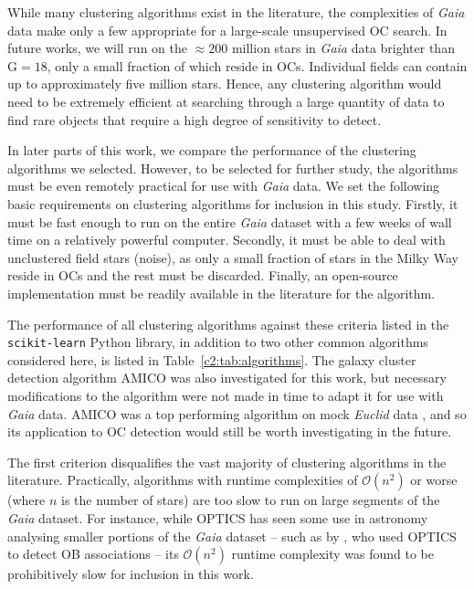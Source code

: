 While many clustering algorithms exist in the literature, the complexities of \emph{Gaia} data make only a few appropriate for a large-scale unsupervised OC search. In future works, we will run on the $\approx 200$ million stars in \emph{Gaia} data brighter than $\text{G}=18$, only a small fraction of which reside in OCs. Individual fields can contain up to approximately five million stars. Hence, any clustering algorithm would need to be extremely efficient at searching through a large quantity of data to find rare objects that require a high degree of sensitivity to detect.

In later parts of this work, we compare the performance of the clustering algorithms we selected. However, to be selected for further study, the algorithms must be even remotely practical for use with \emph{Gaia} data. We set the following basic requirements on clustering algorithms for inclusion in this study. Firstly, it must be fast enough to run on the entire \emph{Gaia} dataset with a few weeks of wall time on a relatively powerful computer. Secondly, it must be able to deal with unclustered field stars (noise), as only a small fraction of stars in the Milky Way reside in OCs and the rest must be discarded. Finally, an open-source implementation must be readily available in the literature for the algorithm.

The performance of all clustering algorithms against these criteria listed in the \texttt{scikit-learn} \citep{pedregosa_scikit-learn_2011} Python library, in addition to two other common algorithms considered here, is listed in Table~\ref{c2:tab:algorithms}. The galaxy cluster detection algorithm AMICO \citep[Adaptive Matched Identifier of Clustered Objects,][]{bellagamba_amico:_2018} was also investigated for this work, but necessary modifications to the algorithm were not made in time to adapt it for use with \emph{Gaia} data. AMICO was a top performing algorithm on mock \emph{Euclid} data \citep{euclid_collaboration_euclid_2019}, and so its application to OC detection would still be worth investigating in the future.

The first criterion disqualifies the vast majority of clustering algorithms in the literature. Practically, algorithms with runtime complexities of $\mathcal{O} ( n^2 )$ or worse (where $n$ is the number of stars) are too slow to run on large segments of the \emph{Gaia} dataset. For instance, while OPTICS \citep{ankerst_optics_1999} has seen some use in astronomy analysing smaller portions of the \emph{Gaia} dataset -- such as by \cite{ward_not_2019}, who used OPTICS to detect OB associations -- its $\mathcal{O} ( n^2 )$ runtime complexity was found to be prohibitively slow for inclusion in this work.


